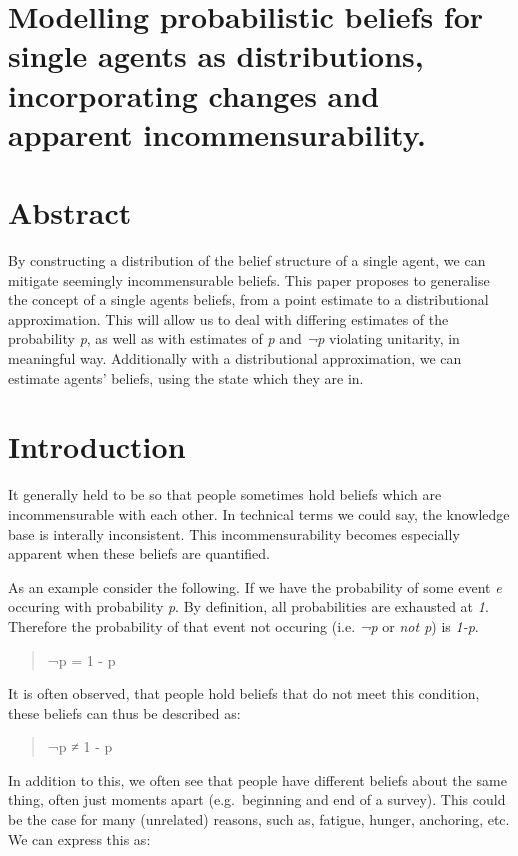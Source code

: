 \documentclass[draft.tex]{subfiles}
\begin{document}
\section{Modelling probabilistic beliefs for single agents as
distributions, incorporating changes and apparent incommensurability.}

\section{Abstract}

By constructing a distribution of the belief structure of a single
agent, we can mitigate seemingly incommensurable beliefs. This paper
proposes to generalise the concept of a single agents beliefs, from a
point estimate to a distributional approximation. This will allow us to
deal with differing estimates of the probability \emph{p}, as well as
with estimates of \emph{p} and \emph{¬p} violating unitarity, in
meaningful way. Additionally with a distributional approximation, we can
estimate agents' beliefs, using the state which they are in.

\section{Introduction}

It generally held to be so that people sometimes hold beliefs which are
incommensurable with each other. In technical terms we could say, the
knowledge base is interally inconsistent. This incommensurability
becomes especially apparent when these beliefs are quantified.

As an example consider the following. If we have the probability of some
event \emph{e} occuring with probability \emph{p}. By definition, all
probabilities are exhausted at \emph{1}. Therefore the probability of
that event not occuring (i.e. \emph{¬p} or \emph{not p}) is \emph{1-p}.

\begin{quote}
¬p = 1 - p
\end{quote}

It is often observed, that people hold beliefs that do not meet this
condition, these beliefs can thus be described as:

\begin{quote}
¬p ≠ 1 - p
\end{quote}

In addition to this, we often see that people have different beliefs
about the same thing, often just moments apart (e.g.~beginning and end
of a survey). This could be the case for many (unrelated) reasons, such
as, fatigue, hunger, anchoring, etc. We can express this as:
\end{document}
